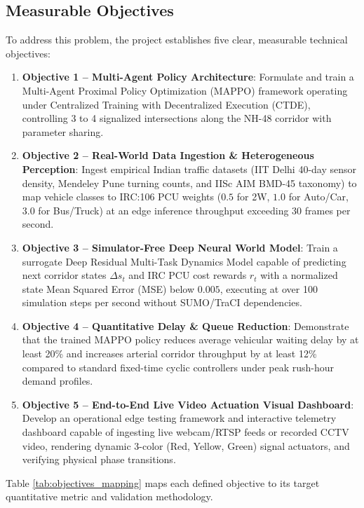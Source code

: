 \documentclass[12pt,a4paper,oneside]{report}
\begin{document}
\subsection{Measurable Objectives}
To address this problem, the project establishes five clear, measurable technical objectives:
\begin{enumerate}
    \item \textbf{Objective 1 -- Multi-Agent Policy Architecture}: Formulate and train a Multi-Agent Proximal Policy Optimization (MAPPO) framework operating under Centralized Training with Decentralized Execution (CTDE), controlling 3 to 4 signalized intersections along the NH-48 corridor with parameter sharing.
    \item \textbf{Objective 2 -- Real-World Data Ingestion \& Heterogeneous Perception}: Ingest empirical Indian traffic datasets (IIT Delhi 40-day sensor density, Mendeley Pune turning counts, and IISc AIM BMD-45 taxonomy) to map vehicle classes to IRC:106 PCU weights ($0.5$ for 2W, $1.0$ for Auto/Car, $3.0$ for Bus/Truck) at an edge inference throughput exceeding 30 frames per second.
    \item \textbf{Objective 3 -- Simulator-Free Deep Neural World Model}: Train a surrogate Deep Residual Multi-Task Dynamics Model capable of predicting next corridor states $\Delta s_t$ and IRC PCU cost rewards $r_t$ with a normalized state Mean Squared Error (MSE) below $0.005$, executing at over 100 simulation steps per second without SUMO/TraCI dependencies.
    \item \textbf{Objective 4 -- Quantitative Delay \& Queue Reduction}: Demonstrate that the trained MAPPO policy reduces average vehicular waiting delay by at least 20\% and increases arterial corridor throughput by at least 12\% compared to standard fixed-time cyclic controllers under peak rush-hour demand profiles.
    \item \textbf{Objective 5 -- End-to-End Live Video Actuation Visual Dashboard}: Develop an operational edge testing framework and interactive telemetry dashboard capable of ingesting live webcam/RTSP feeds or recorded CCTV video, rendering dynamic 3-color (Red, Yellow, Green) signal actuators, and verifying physical phase transitions.
\end{enumerate}

Table \ref{tab:objectives_mapping} maps each defined objective to its target quantitative metric and validation methodology.
\end{document}
